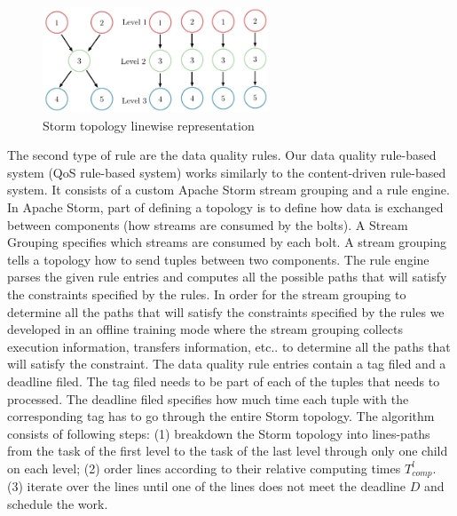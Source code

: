 \begin{figure}[h!]
  \centering
  \includegraphics[width=0.6\textwidth]{Figures/AlgoImg.pdf}
  \caption{Storm topology linewise representation}
  \label{fig:AlgoImg}
\end{figure}


The second type of rule are the data quality rules. Our data quality rule-based system (QoS rule-based system) works similarly to the content-driven rule-based system. It consists of a custom Apache Storm stream grouping and a rule engine. In Apache Storm, part of defining a topology is to define how data is exchanged between components (how streams are consumed by the bolts). A Stream Grouping specifies which streams are consumed by each bolt. A stream grouping tells a topology how to send tuples between two components. The rule engine parses the given rule entries and computes all the possible paths that will satisfy the constraints specified by the rules. In order for the stream grouping to determine all the paths that will satisfy the constraints specified by the rules we developed in an offline training mode where the stream grouping collects execution information, transfers information, etc.. to determine all the paths that will satisfy the constraint. The data quality rule entries contain a tag filed and a deadline filed. The tag filed needs to be part of each of the tuples that needs to processed. The deadline filed specifies how much time each tuple with the corresponding tag has to go through the entire Storm topology. The algorithm consists of following steps: (1) breakdown the Storm topology into lines-paths from the task of the first level to the task of the last level through only one child on each level; (2) order lines according to their relative computing times $T_{comp}^l$. (3) iterate over the lines until one of the lines does not meet the deadline $D$ and schedule the work.

